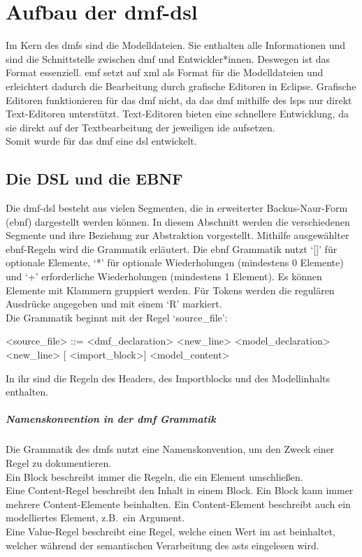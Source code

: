 \documentclass[./einleitung.tex]{subfiles}
\begin{document}
\section{Aufbau der \acrshort{dmf}-\acrshort{dsl}}
Im Kern des \acrshort{dmf}s sind die Modelldateien.
Sie enthalten alle Informationen und sind die Schnittstelle zwischen \acrshort{dmf} und Entwickler*innen.
Deswegen ist das Format essenziell.
\acrshort{emf} setzt auf \acrshort{xml} als Format für die Modelldateien und erleichtert dadurch die Bearbeitung durch grafische Editoren in Eclipse.
Grafische Editoren funktionieren für das \acrshort{dmf} nicht, da das \acrshort{dmf} mithilfe des \acrlong{lsp}s nur direkt Text-Editoren unterstützt.
Text-Editoren bieten eine schnellere Entwicklung, da sie direkt auf der Textbearbeitung der jeweiligen \acrshort{ide} aufsetzen. \\
Somit wurde für das \acrshort{dmf} eine \acrfull{dsl} entwickelt.
\subsection{Die DSL und die EBNF}
Die \acrshort{dmf}-\acrshort{dsl} besteht aus vielen Segmenten, die in erweiterter Backus-Naur-Form (\acrshort{ebnf}) dargestellt werden können.
In diesem Abschnitt werden die verschiedenen Segmente und ihre Beziehung zur Abstraktion vorgestellt.
Mithilfe ausgewählter \acrshort{ebnf}-Regeln wird die Grammatik erläutert.\newline \newline
Die \acrshort{ebnf} Grammatik nutzt `[]' für optionale Elemente, `*' für optionale Wiederholungen (mindestens 0 Elemente) und `+' erforderliche Wiederholungen (mindestens 1 Element).
Es können Elemente mit Klammern gruppiert werden.
Für Tokens werden die regulären Ausdrücke angegeben und mit einem `R' markiert.\\

Die Grammatik beginnt mit der Regel `source\_file':
\begin{grammar}
<source\_file> ::= <dmf_declaration> <new_line> <model_declaration> <new_line> [ <import_block>] <model_content>
\end{grammar}
In ihr sind die Regeln des Headers, des Importblocks und des Modellinhalts enthalten.

\subparagraph{Namenskonvention in der \acrshort{dmf} Grammatik}
Die Grammatik des \acrshort{dmf}s nutzt eine Namenskonvention, um den Zweck einer Regel zu dokumentieren.\\
Ein Block beschreibt immer die Regeln, die ein Element umschließen. \\
Eine Content-Regel beschreibt den Inhalt in einem Block.
Ein Block kann immer mehrere Content-Elemente beinhalten.
Ein Content-Element beschreibt auch ein modelliertes Element, z.B.\ ein Argument. \\
Eine Value-Regel beschreibt eine Regel, welche einen Wert im \acrshort{ast} beinhaltet, welcher während der semantischen Verarbeitung des \acrshort{ast}s eingelesen wird.
\end{document}
